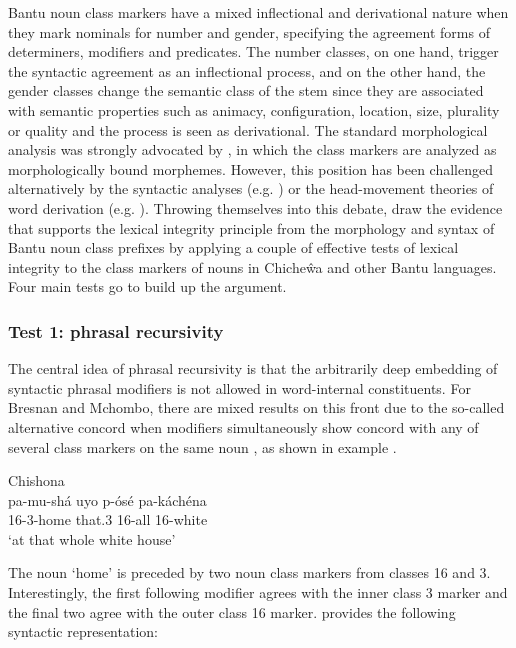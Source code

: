 \documentclass[output=paper,hidelinks]{langscibook}
\begin{document}
Bantu noun class markers have a mixed inflectional and derivational nature when they mark nominals for number and gender, specifying the agreement forms of determiners, modifiers and predicates. The number classes, on one hand, trigger the syntactic agreement as an inflectional process, and on the other hand, the gender classes change the semantic class of the stem since they are associated with semantic properties such as animacy, configuration, location, size, plurality or quality and the process is seen as derivational. The standard morphological analysis was strongly advocated by \citet{Doke1929,Doke1935}, in which the class markers are analyzed as morphologically bound morphemes. However, this position has been challenged alternatively by the syntactic analyses (e.g. \citealt{Myers1987}) or the head-movement theories of word derivation (e.g. \citealt{Kinyalolo1991,Carstens1991}). Throwing themselves into this debate, \citet{bresnan1995the-lexical} draw the evidence that supports the lexical integrity principle from the morphology and syntax of Bantu noun class prefixes by applying a couple of effective tests of lexical integrity to the class markers of nouns in Chiche\^wa and other Bantu languages. Four main tests go to build up the argument.

\subsubsection{Test 1: phrasal recursivity}

The central idea of phrasal recursivity is that the arbitrarily deep embedding of syntactic phrasal modifiers is not allowed in word-internal constituents. For Bresnan and Mchombo, there are mixed results on this front due to the so-called alternative concord when modifiers simultaneously show concord with any of several class markers on the same noun \citep[195]{bresnan1995the-lexical}, as shown in example . 

\ea\label{ex:African:3} Chishona \citep[104]{Myers1987}\\
    \gll pa-mu-shá uyo p-ósé pa-káchéna\\
        16-3-home  that.3 16-all  16-white\\
    \glt ‘at that whole white house’
    \z

\largerpage[2]
The noun `home' is preceded by two noun class markers from classes 16 and 3. Interestingly, the first following modifier agrees with the inner class 3 marker and the final two agree with the outer class 16 marker. \citet{Myers1987} provides the following syntactic representation:
\end{document}
